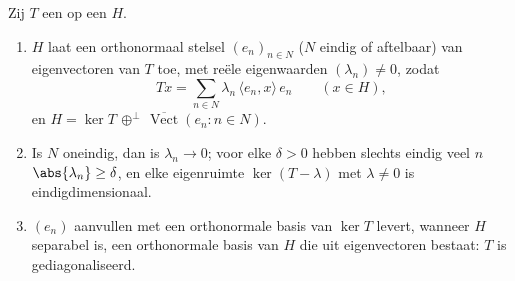 \begin{theorem}\label{thm:b3:spectral:spectral}
Zij $T$ een   op een
 $H$.
\begin{enumerate}
  \item $H$ laat een orthonormaal stelsel $(e_n)_{n \in N}$ ($N$
        eindig of aftelbaar) van eigenvectoren van $T$ toe, met
        reële eigenwaarden $(\lambda_n) \neq 0$, zodat
        \[
        Tx = \sum_{n\in N}\lambda_n\,\langle e_n, x\rangle\,
        e_n \qquad (x \in H),
        \]
        en $H = \ker T \,\oplus^\perp\,
        \overline{\operatorname{Vect}}(e_n : n \in N)$.
  \item Is $N$ oneindig, dan is $\lambda_n \to 0$; voor elke
        $\delta > 0$ hebben slechts eindig veel $n$
        $\abs{\lambda_n} \geq \delta$, en elke eigenruimte
        $\ker(T - \lambda)$ met $\lambda \neq 0$ is
        eindigdimensionaal.
  \item $(e_n)$ aanvullen met een orthonormale basis van $\ker T$
        levert, wanneer $H$ separabel is, een orthonormale basis
        van $H$ die uit eigenvectoren bestaat: $T$ is
        gediagonaliseerd.
\end{enumerate}
\end{theorem}

